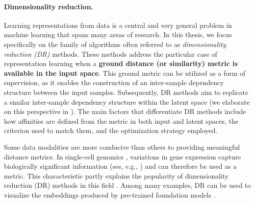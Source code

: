 \paragraph{Dimensionality reduction.}
Learning representations from data is a central and very general problem in machine learning that spans many areas of research. In this thesis, we focus specifically on the family of algorithms often referred to as \emph{dimensionality reduction (DR)} methods. These methods address the particular case of representation learning when a \textbf{ground distance (or similarity) metric is available in the input space}. This ground metric can be utilized as a form of supervision, as it enables the construction of an inter-sample dependency structure between the input samples. Subsequently, DR methods aim to replicate a similar inter-sample dependency structure within the latent space (we elaborate on this perspective in ).
The main factors that differentiate DR methods include how affinities are defined from the metric in both input and latent spaces, the criterion used to match them, and the optimization strategy employed. 

Some data modalities are more conducive than others to providing meaningful distance metrics. In single-cell genomics \citep{amir2013visne}, variations in gene expression capture biologically significant information (see, e.g., ) and can therefore be used as a metric. This characteristic partly explains the popularity of dimensionality reduction (DR) methods in this field \citep{kobak2019art}. Among many examples, DR can be used to visualize the embeddings produced by pre-trained foundation models \citep{gonzalez2022two}.

